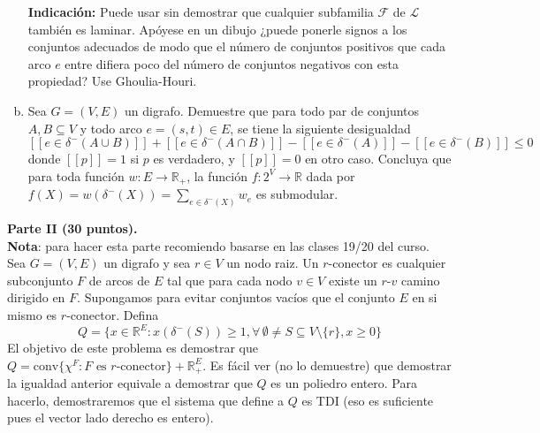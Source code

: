 \documentclass{article}
\newcommand{\IV}[1]{[\![#1]\!]} %
\newcommand{\RR}{\mathbb R}
\theoremstyle{plain}
\theoremstyle{definition}
\theoremstyle{Azul}
\begin{document}
\begin{enumerate}[(a)]
\textbf{Indicación:} Puede usar sin demostrar que cualquier subfamilia $\mathcal{F}$ de $\mathcal{L}$ también es laminar. Apóyese en un dibujo ¿puede ponerle signos a los conjuntos adecuados de modo que el número de conjuntos positivos que cada arco $e$ entre difiera poco del número de conjuntos negativos con esta propiedad? Use Ghoulia-Houri.
\item Sea $G=(V,E)$ un digrafo. Demuestre que para todo par de conjuntos $A, B\subseteq V$ y todo arco $e=(s,t)\in E$, se tiene la siguiente desigualdad
$$\IV{e\in \delta^-(A\cup B)}+\IV{e\in \delta^-(A\cap B)}-\IV{e\in \delta^-(A)}-\IV{e\in \delta^-(B)} \leq 0$$
donde $\IV{p}=1$ si $p$ es verdadero, y $\IV{p}=0$ en otro caso.
Concluya que para toda función $w\colon E \to \RR_+$, la función $f\colon 2^V\to \RR$ dada por $f(X)=w(\delta^-(X)) = \sum_{e\in \delta^-(X)}w_e$ es submodular.
\end{enumerate}

\noindent \textbf{Parte II (30 puntos).} \\
\textbf{Nota}: para hacer esta parte recomiendo basarse en las clases 19/20 del curso.\\

Sea $G=(V,E)$ un digrafo y sea $r\in V$ un nodo raiz. Un $r$-conector es cualquier subconjunto $F$ de arcos de $E$ tal que para cada nodo $v\in V$ existe un $r$-$v$ camino dirigido en $F$. Supongamos para evitar conjuntos vacíos que el conjunto $E$ en si mismo es $r$-conector. Defina
$$Q=\{x\in \RR^E\colon x(\delta^-(S))\geq 1, \forall\, \emptyset \neq S\subseteq V\setminus \{r\}, x\geq 0\}$$
El objetivo de este problema es demostrar que $Q=\text{conv}\{\chi^F\colon F\text{ es $r$-conector}\}+\RR_+^E$. Es fácil ver (no lo demuestre) que demostrar la igualdad anterior equivale a demostrar que $Q$ es un poliedro entero. Para hacerlo, demostraremos que el sistema que define a $Q$ es TDI (eso es suficiente pues el vector lado derecho es entero).
\end{document}
